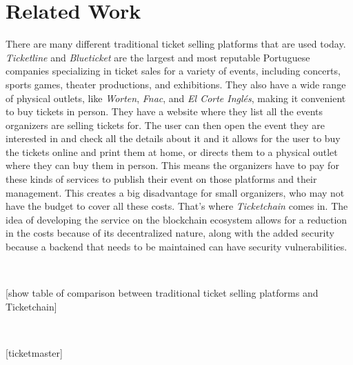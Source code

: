 \section{Related Work}

There are many different traditional ticket selling platforms that are used today. \emph{Ticketline} and \emph{Blueticket} are the largest and most reputable Portuguese companies specializing in ticket sales for a variety of events, including concerts, sports games, theater productions, and exhibitions. They also have a wide range of physical outlets, like \emph{Worten}, \emph{Fnac}, and \emph{El Corte Inglés}, making it convenient to buy tickets in person.
They have a website where they list all the events organizers are selling tickets for. The user can then open the event they are interested in and check all the details about it and it allows for the user to buy the tickets online and print them at home, or directs them to a physical outlet where they can buy them in person.
This means the organizers have to pay for these kinds of services to publish their event on those platforms and their management. This creates a big disadvantage for small organizers, who may not have the budget to cover all these costs.
That's where \emph{Ticketchain} comes in. The idea of developing the service on the blockchain ecosystem allows for a reduction in the costs because of its decentralized nature, along with the added security because a backend that needs to be maintained can have security vulnerabilities.

~

[show table of comparison between traditional ticket selling platforms and Ticketchain]

~

[ticketmaster]
